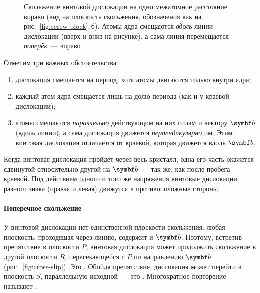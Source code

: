 \begin{figure}[ht]
\centering
\begin{subfigure}[b]{0.48\textwidth}\centering
{}
\caption{}
\end{subfigure}\hfill
\begin{subfigure}[b]{0.48\textwidth}\centering
{}
\caption{}
\end{subfigure}
\caption{Скольжение винтовой дислокации на одно межатомное расстояние
вправо (вид на плоскость скольжения, обозначения как на
рис.~\ref{fig:screw-block},\,б). Атомы ядра смещаются \emph{вдоль} линии
дислокации (вверх и вниз на рисунке), а сама линия перемещается
\emph{поперёк}~— вправо}
\label{fig:screw-glide}
\end{figure}

Отметим три важных обстоятельства:
\begin{enumerate}[label=\arabic*)]
\item дислокация смещается на период, хотя атомы двигаются только внутри
ядра;
\item каждый атом ядра смещается лишь на долю периода (как и у краевой
дислокации);
\item атомы смещаются \emph{параллельно} действующим на них силам и
вектору $\vb b$ (вдоль линии), а сама дислокация движется
\emph{перпендикулярно} им. Этим винтовая дислокация отличается от
краевой, которая движется вдоль $\vb b$.
\end{enumerate}

Когда винтовая дислокация пройдёт через весь кристалл, одна его часть
окажется сдвинутой относительно другой на $\vb b$~— так же, как после
пробега краевой. Под действием одного и того же напряжения винтовые
дислокации разного знака (правая и левая) движутся в противоположные
стороны.

\paragraph{Поперечное скольжение}
У винтовой дислокации нет единственной плоскости скольжения: любая
плоскость, проходящая через линию, содержит и $\vb b$. Поэтому, встретив
препятствие в плоскости $P$, винтовая дислокация может продолжить
скольжение в другой плоскости $R$, пересекающейся с $P$ по направлению
$\vb b$ (рис.~\ref{fig:cross-slip}). Это .
Обойдя препятствие, дислокация может перейти в плоскость $S$,
параллельную исходной~— это .
Многократное повторение называют .

